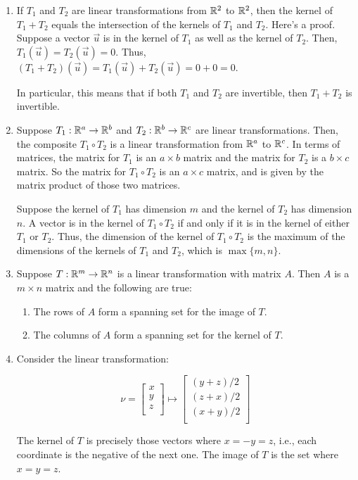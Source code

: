 \documentclass[10pt]{amsart}
\begin{document}
\begin{enumerate}

\item If $T_1$ and $T_2$ are linear transformations from $\mathbb{R}^2$ to
  $\mathbb{R}^2$, then the kernel of $T_1 + T_2$ equals the intersection of
  the kernels of $T_1$ and $T_2$. Here's a proof. Suppose a vector
  $\vec{u}$ is in the kernel of $T_1$ as well as the kernel of
  $T_2$. Then, $T_1(\vec{u}) = T_2(\vec{u}) = 0$. Thus, $(T_1 +
  T_2)(\vec{u}) = T_1(\vec{u}) + T_2(\vec{u}) = 0 + 0 = 0$.

  In particular, this means that if both $T_1$ and $T_2$ are
  invertible, then $T_1 + T_2$ is invertible.
\item Suppose $T_1: \mathbb{R}^a \to \mathbb{R}^b$ and $T_2:\mathbb{R}^b \to \mathbb{R}^c$ are linear
  transformations. Then, the composite $T_1 \circ T_2$ is a linear
  transformation from $\mathbb{R}^a$ to $\mathbb{R}^c$. In terms of matrices, the
  matrix for $T_1$ is an $a \times b$ matrix and the matrix for $T_2$
  is a $b \times c$ matrix. So the matrix for $T_1 \circ T_2$ is an $a
  \times c$ matrix, and is given by the matrix product of those two
  matrices.

  Suppose the kernel of $T_1$ has dimension $m$ and the kernel of
  $T_2$ has dimension $n$. A vector is in the kernel of $T_1 \circ
  T_2$ if and only if it is in the kernel of either $T_1$ or
  $T_2$. Thus, the dimension of the kernel of $T_1 \circ T_2$ is the
  maximum of the dimensions of the kernels of $T_1$ and $T_2$, which
  is $\max \{ m,n \}$.
\item Suppose $T:\mathbb{R}^m \to \mathbb{R}^n$ is a linear transformation with matrix
  $A$. Then $A$ is a $m \times n$ matrix and the following are true:

  \begin{enumerate}
  \item The rows of $A$ form a spanning set for the image of $T$.
  \item The columns of $A$ form a spanning set for the kernel of $T$.
  \end{enumerate}
\item Consider the linear transformation:

  $$\nu = \left[ \begin{matrix} x \\ y \\ z \\ \end{matrix}\right] \mapsto \left[ \begin{matrix} (y + z)/2 \\ (z + x)/2 \\ (x + y)/2 \\ \end{matrix} \right]$$

  The kernel of $T$ is precisely those vectors where $x = -y = z$,
  i.e., each coordinate is the negative of the next one. The image of
  $T$ is the set where $x = y = z$.
\end{enumerate}
\end{document}

